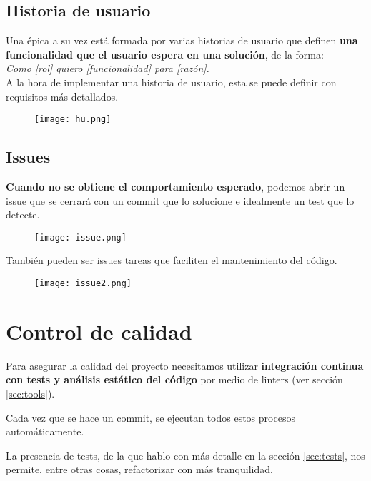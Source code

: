 \subsection{Historia de usuario}
Una épica a su vez está formada por varias historias de usuario que definen \textbf{una funcionalidad que el usuario espera en una solución}, de la forma:\\ \textit{Como [rol] quiero [funcionalidad] para [razón].}\\

A la hora de implementar una historia de usuario, esta se puede definir con requisitos más detallados.

\begin{figure}[H]
	\centering	
	\texttt{[image: hu.png]}
	\end{figure}

\subsection{Issues}
\textbf{Cuando no se obtiene el comportamiento esperado}, podemos abrir un issue que se cerrará con un commit que lo solucione e idealmente un test que lo detecte.

\begin{figure}[H]
	\centering	
	\texttt{[image: issue.png]}
	\end{figure}

	También pueden ser issues tareas que faciliten el mantenimiento del código.

\begin{figure}[H]
	\centering	
	\texttt{[image: issue2.png]}
	\end{figure}


\section{Control de calidad}

Para asegurar la calidad del proyecto necesitamos utilizar \textbf{integración continua con tests y análisis estático del código} por medio de linters (ver sección \ref{sec:tools}).


Cada vez que se hace un commit, se ejecutan todos estos procesos automáticamente.

La presencia de tests, de la que hablo con más detalle en la sección \ref{sec:tests}, nos permite, entre otras cosas, refactorizar con más 
tranquilidad. \\

